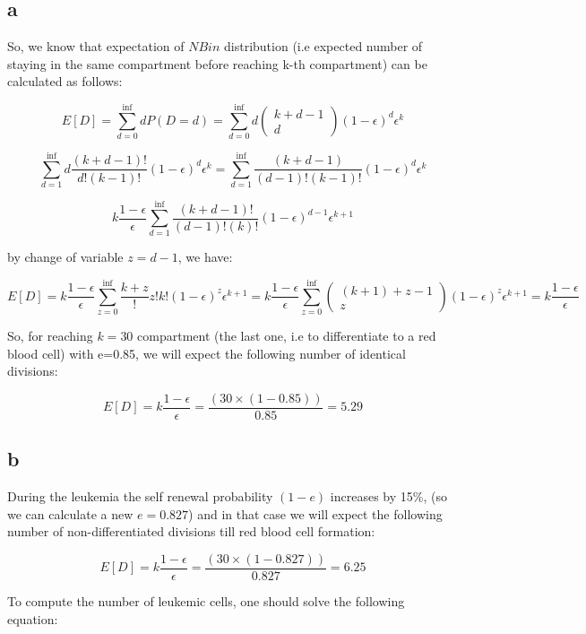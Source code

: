 \subsection{a}

So, we know that expectation of $NBin$ distribution (i.e expected number of staying in the same compartment before reaching k-th compartment) can be calculated as follows:

\[ E[D] = \sum\limits_{d=0}^{\inf} dP(D=d) = \sum\limits_{d=0}^{\inf} d \left( \begin{matrix}
  k+d-1 \\
  d
 \end{matrix} \right) (1-\epsilon)^{d}\epsilon^k  \]
 
 \[ \sum\limits_{d=1}^{\inf} d \frac{(k+d-1)!}{d! (k-1)!}(1-\epsilon)^d\epsilon^k = \sum\limits_{d=1}^{\inf}\frac{(k+d-1)}{(d-1)!(k-1)!}(1-\epsilon)^d\epsilon^k\]

\[ k\frac{1-\epsilon}{\epsilon} \sum\limits_{d=1}^{\inf} \frac{(k+d-1)!}{(d-1)!(k)!}(1-\epsilon)^{d-1}\epsilon^{k+1}  \]

by change of variable $z=d-1$, we have:

\[ E[D] = k\frac{1-\epsilon}{\epsilon}\sum\limits_{z=0}^{\inf} \frac{k+z}!{z!k!}(1-\epsilon)^z\epsilon^{k+1} = k\frac{1-\epsilon}{\epsilon} \sum\limits_{z=0}^{\inf} \left( \begin{matrix}
  (k+1)+z-1 \\
  z
 \end{matrix} \right) (1-\epsilon)^z\epsilon^{k+1} = k\frac{1-\epsilon}{\epsilon}\]
 
 So, for reaching $k=30$ compartment (the last one, i.e to differentiate to a red blood cell) with e=0.85, we will expect the following number of identical divisions:

\[ E[D]=k\frac{1-\epsilon}{\epsilon}=\frac{(30\times(1-0.85))}{0.85}=5.29 \]

\subsection{b}

During the leukemia the self renewal probability $(1-e)$ increases by 15\%, (so we can calculate a new $e=0.827$) and in that case we will expect the following number of non-differentiated divisions till red blood cell formation:

\[ E[D]=k\frac{1-\epsilon}{\epsilon}=\frac{(30\times(1-0.827))}{0.827}=6.25 \]

To compute the number of leukemic cells, one should solve the following equation:

